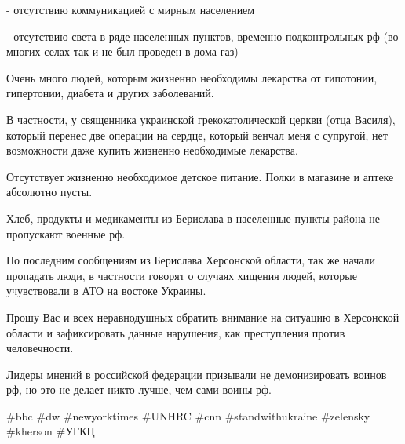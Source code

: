 - отсутствию коммуникацией с мирным населением

- отсутствию света в ряде населенных пунктов, временно подконтрольных рф (во
многих селах так и не был проведен в дома газ)

Очень много людей, которым жизненно необходимы лекарства от гипотонии,
гипертонии, диабета и других заболеваний.

В частности, у священника украинской грекокатолической церкви (отца Василя),
который перенес две операции на сердце, который венчал меня с супругой, нет
возможности даже купить жизненно необходимые лекарства.

Отсутствует жизненно необходимое детское питание. Полки в магазине и аптеке
абсолютно пусты.

Хлеб, продукты и медикаменты из Берислава в населенные пункты района не
пропускают военные рф.

По последним сообщениям из Берислава Херсонской области, так же начали
пропадать люди, в частности говорят о случаях хищения людей, которые
учувствовали в АТО на востоке Украины.

Прошу Вас и всех неравнодушных обратить внимание на ситуацию в Херсонской
области и зафиксировать данные нарушения, как преступления против человечности. 

Лидеры мнений в российской федерации призывали не демонизировать воинов рф, но
это не делает никто лучше, чем сами воины рф.

\#bbc \#dw \#newyorktimes \#UNHRC \#cnn \#standwithukraine \#zelensky \#kherson \#УГКЦ

